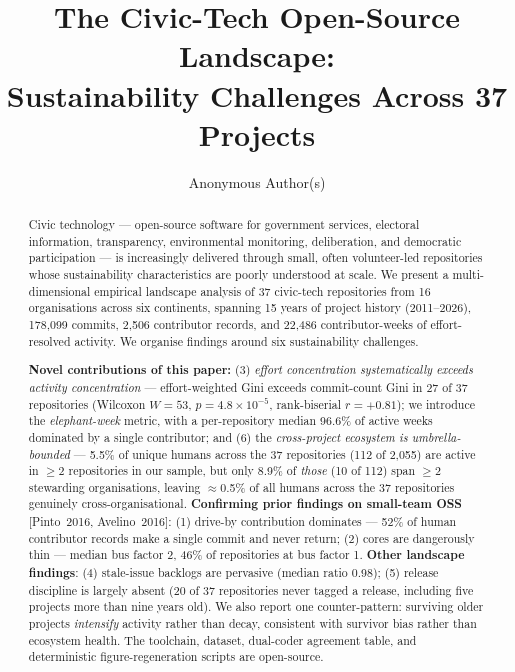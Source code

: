 \documentclass[a4paper,UKenglish,cleveref,autoref,thm-restate]{lipics-v2021}
\title{The Civic-Tech Open-Source Landscape:\\Sustainability Challenges Across 37 Projects}
\author{Anonymous Author(s)}{Anonymised for double-anonymous review}{}{}{}
\begin{document}
\maketitle

\begin{abstract}
Civic technology --- open-source software for government services, electoral information, transparency, environmental monitoring, deliberation, and democratic participation --- is increasingly delivered through small, often volunteer-led repositories whose sustainability characteristics are poorly understood at scale. We present a multi-dimensional empirical landscape analysis of 37 civic-tech repositories from 16 organisations across six continents, spanning 15 years of project history (2011--2026), 178{,}099 commits, 2{,}506 contributor records, and 22{,}486 contributor-weeks of effort-resolved activity. We organise findings around six sustainability challenges.

\textbf{Novel contributions of this paper:} (3) \emph{effort concentration systematically exceeds activity concentration} --- effort-weighted Gini exceeds commit-count Gini in 27 of 37 repositories (Wilcoxon $W = 53$, $p = 4.8 \times 10^{-5}$, rank-biserial $r = +0.81$); we introduce the \emph{elephant-week} metric, with a per-repository median 96.6\% of active weeks dominated by a single contributor; and (6) the \emph{cross-project ecosystem is umbrella-bounded} --- 5.5\% of unique humans across the 37 repositories (112 of 2{,}055) are active in $\geq 2$ repositories in our sample, but only 8.9\% of \emph{those} (10 of 112) span $\geq 2$ stewarding organisations, leaving $\approx$0.5\% of all humans across the 37 repositories genuinely cross-organisational. \textbf{Confirming prior findings on small-team OSS} [Pinto~2016, Avelino~2016]: (1) drive-by contribution dominates --- 52\% of human contributor records make a single commit and never return; (2) cores are dangerously thin --- median bus factor 2, 46\% of repositories at bus factor 1. \textbf{Other landscape findings}: (4) stale-issue backlogs are pervasive (median ratio 0.98); (5) release discipline is largely absent (20 of 37 repositories never tagged a release, including five projects more than nine years old). We also report one counter-pattern: surviving older projects \emph{intensify} activity rather than decay, consistent with survivor bias rather than ecosystem health. The toolchain, dataset, dual-coder agreement table, and deterministic figure-regeneration scripts are open-source.
\end{abstract}
\end{document}
